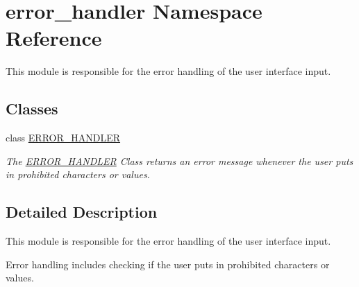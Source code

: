 \hypertarget{namespaceerror__handler}{}\section{error\+\_\+handler Namespace Reference}
\label{namespaceerror__handler}


This module is responsible for the error handling of the user interface input.  


\subsection*{Classes}
\begin{DoxyCompactItemize}
\item 
class \hyperlink{classerror__handler_1_1ERROR__HANDLER}{E\+R\+R\+O\+R\+\_\+\+H\+A\+N\+D\+L\+ER}
\begin{DoxyCompactList}\small\item\em The \hyperlink{classerror__handler_1_1ERROR__HANDLER}{E\+R\+R\+O\+R\+\_\+\+H\+A\+N\+D\+L\+ER} Class returns an error message whenever the user puts in prohibited characters or values. \end{DoxyCompactList}\end{DoxyCompactItemize}


\subsection{Detailed Description}
This module is responsible for the error handling of the user interface input. 

Error handling includes checking if the user puts in prohibited characters or values. 
